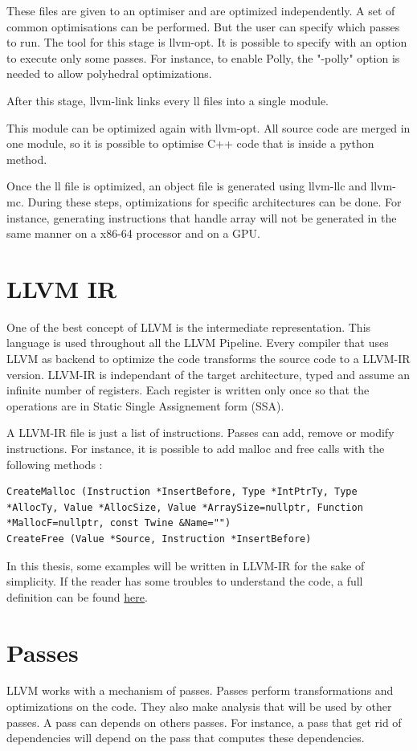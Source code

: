 These files are given to an optimiser and are optimized independently. A set of common optimisations can be performed. But the user can specify which passes to run. The tool for this stage is llvm-opt. It is possible to specify with an option to execute only some passes. For instance, to enable Polly, the "-polly" option is needed to allow polyhedral optimizations.

After this stage, llvm-link links every ll files into a single module.

This module can be optimized again with llvm-opt. All source code are merged in one module, so it is possible to optimise C++ code that is inside a python method. 

Once the ll file is optimized, an object file is generated using llvm-llc and llvm-mc. During these steps, optimizations for specific architectures can be done. For instance, generating instructions that handle array will not be generated in the same manner on a x86-64 processor and on a GPU.

\section{LLVM IR}
One of the best concept of LLVM is the intermediate representation. This language is used throughout all the LLVM Pipeline. Every compiler that uses LLVM as backend to optimize the code transforms the source code to a LLVM-IR version. LLVM-IR is independant of the target architecture, typed and assume an infinite number of registers. Each register is written only once so that the operations are in Static Single Assignement form (SSA). 

A LLVM-IR file is just a list of instructions. Passes can add, remove or modify instructions. For instance, it is possible to add malloc and free calls with the following methods :
\begin{lstlisting}[frame=single]
CreateMalloc (Instruction *InsertBefore, Type *IntPtrTy, Type *AllocTy, Value *AllocSize, Value *ArraySize=nullptr, Function *MallocF=nullptr, const Twine &Name="")
CreateFree (Value *Source, Instruction *InsertBefore)
\end{lstlisting}

In this thesis, some examples will be written in LLVM-IR for the sake of simplicity. If the reader has some troubles to understand the code, a full definition can be found \href{https://llvm.org/docs/LangRef.html}{here}.

\section{Passes}
LLVM works with a mechanism of passes. Passes perform transformations and optimizations on the code. They also make analysis that will be used by other passes. A pass can depends on others passes. For instance, a pass that get rid of dependencies will depend on the pass that computes these dependencies.

